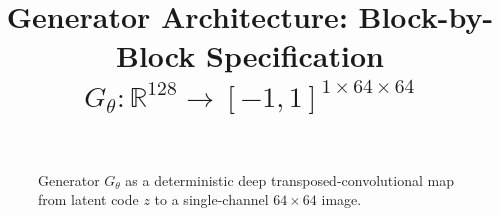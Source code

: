 \documentclass{tex-notes}
\title{\vspace{-2em}Generator Architecture: Block-by-Block Specification\\
  {\large \textnormal{%
    $G_\theta : \mathbb{R}^{128} \longrightarrow [-1, 1]^{1 \times 64 \times 64}$%
  }}}
\author{}
\date{}
\begin{document}
\maketitle
\vspace{-2.5em}

\begin{figure}[h]
\centering
\resizebox{!}{0.78\textheight}{%
}
\caption{Generator $G_\theta$ as a deterministic deep
transposed-convolutional map from latent code $z$ to a single-channel
$64 \times 64$ image.}
\end{figure}


















\end{document}
